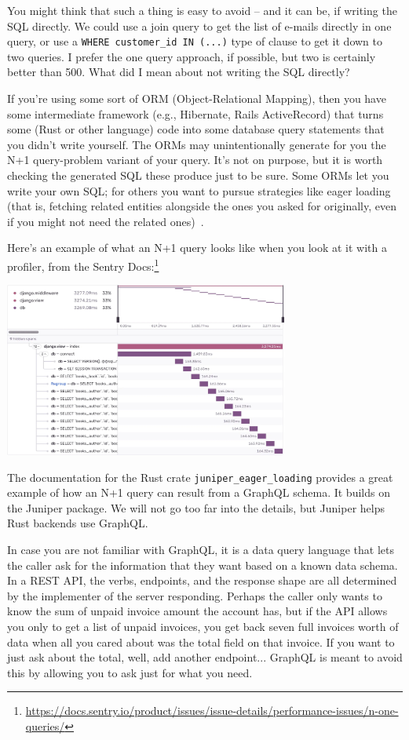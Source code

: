 You might think that such a thing is easy to avoid -- and it can be, if writing the SQL directly. We could use a join query to get the list of e-mails directly in one query, or use a \texttt{WHERE customer\_id IN (...)} type of clause to get it down to two queries. I prefer the one query approach, if possible, but two is certainly better than 500. What did I mean about not writing the SQL directly?

If you're using some sort of ORM (Object-Relational Mapping), then you have some intermediate framework (e.g., Hibernate, Rails ActiveRecord) that turns some (Rust or other language) code into some database query statements that you didn't write yourself. The ORMs may unintentionally generate for you the N+1 query-problem variant of your query. It's not on purpose, but it is worth checking the generated SQL these produce just to be sure. Some ORMs let you write your own SQL; for others you want to pursue strategies like eager loading (that is, fetching related entities alongside the ones you asked for originally, even if you might not need the related ones)~\cite{nplusone}. 

Here's an example of what an N+1 query looks like when you look at it with a profiler, from the Sentry Docs:\footnote{\url{https://docs.sentry.io/product/issues/issue-details/performance-issues/n-one-queries/}}
\begin{center}
  \includegraphics[width=0.7\textwidth]{images/nplusone.png}
\end{center}

The documentation for the Rust crate \texttt{juniper\_eager\_loading} provides a great example of how an N+1 query can result from a GraphQL schema. It builds on the Juniper package. We will not go too far into the details, but Juniper helps Rust backends use GraphQL.

In case you are not familiar with GraphQL, it is a data query language that lets the caller ask for the information that they want based on a known data schema. In a REST API, the verbs, endpoints, and the response shape are all determined by the implementer of the server responding. Perhaps the caller only wants to know the sum of unpaid invoice amount the account has, but if the API allows you only to get a list of unpaid invoices, you get back seven full invoices worth of data when all you cared about was the total field on that invoice. If you want to just ask about the total, well, add another endpoint... GraphQL is meant to avoid this by allowing you to ask just for what you need.


